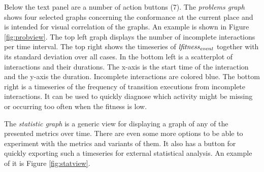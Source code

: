 Below the text panel are a number of action buttons (7). The \emph{problems graph} shows four selected graphs concerning the conformance at the current place and is intended for visual correlation of the graphs. An example is shown in Figure \ref{fig:probview}. The top left graph displays the number of incomplete interactions per time interval. The top right shows the timeseries of $\mathit{lfitness_{event}}$ together with its standard deviation over all cases. In the bottom left is a scatterplot of interactions and their durations. The x-axis is the start time of the interaction and the y-axis the duration. Incomplete interactions are colored blue. The bottom right is a timeseries of the frequency of transition executions from incomplete interactions. It can be used to quickly diagnose which activity might be missing or occurring too often when the fitness is low.

The \emph{statistic graph} is a generic view for displaying a graph of any of the presented metrics over time. There are even some more options to be able to experiment with the metrics and variants of them. It also has a button for quickly exporting such a timeseries for external statistical analysis. An example of it is Figure \ref{fig:statview}.
 
